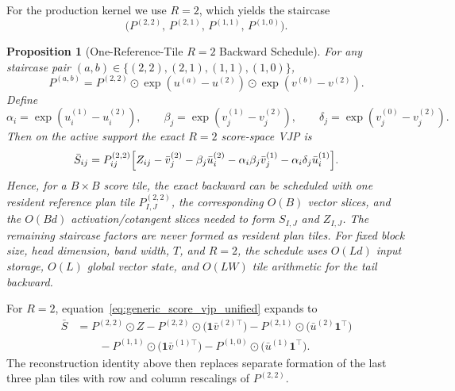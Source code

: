 \documentclass{article}
\newtheorem{proposition}{Proposition}
\begin{document}
For the production kernel we use $R=2$, which yields the staircase
\[
\bigl(P^{(2,2)},\,P^{(2,1)},\,P^{(1,1)},\,P^{(1,0)}\bigr).
\]

\begin{proposition}[One-Reference-Tile \texorpdfstring{$R=2$}{R=2} Backward Schedule]\label{thm:single_base_main}
For any staircase pair $(a,b)\in\{(2,2),(2,1),(1,1),(1,0)\}$,
\[
P^{(a,b)}
=
P^{(2,2)}
\odot
\exp(u^{(a)}-u^{(2)})
\odot
\exp(v^{(b)}-v^{(2)}).
\]
Define
\[
\alpha_i=\exp(u_i^{(1)}-u_i^{(2)}),
\qquad
\beta_j=\exp(v_j^{(1)}-v_j^{(2)}),
\qquad
\delta_j=\exp(v_j^{(0)}-v_j^{(2)}).
\]
Then on the active support the exact $R=2$ score-space VJP is
\[
\bar S_{ij}
=
P^{(2,2)}_{ij}
\Bigl[
Z_{ij}
-\bar v^{(2)}_j
-\beta_j\bar u^{(2)}_i
-\alpha_i\beta_j\bar v^{(1)}_j
-\alpha_i\delta_j\bar u^{(1)}_i
\Bigr].
\]
Hence, for a $B\times B$ score tile, the exact backward can be scheduled with one resident reference plan tile $P^{(2,2)}_{I,J}$, the corresponding $O(B)$ vector slices, and the $O(Bd)$ activation/cotangent slices needed to form $S_{I,J}$ and $Z_{I,J}$. The remaining staircase factors are never formed as resident plan tiles. For fixed block size, head dimension, band width, $T$, and $R=2$, the schedule uses $O(Ld)$ input storage, $O(L)$ global vector state, and $O(LW)$ tile arithmetic for the tail backward.
\end{proposition}

For $R=2$, equation~\eqref{eq:generic_score_vjp_unified} expands to
\begin{align}
\bar S
&=
P^{(2,2)} \odot Z
-
P^{(2,2)} \odot \bigl(\mathbf{1}\bar v^{(2)\top}\bigr)
-
P^{(2,1)} \odot \bigl(\bar u^{(2)}\mathbf{1}^\top\bigr) \nonumber \\
&\qquad
-
P^{(1,1)} \odot \bigl(\mathbf{1}\bar v^{(1)\top}\bigr)
-
P^{(1,0)} \odot \bigl(\bar u^{(1)}\mathbf{1}^\top\bigr).
\label{eq:r2_expanded_vjp}
\end{align}
The reconstruction identity above then replaces separate formation of the last three plan tiles with row and column rescalings of $P^{(2,2)}$.
\end{document}
